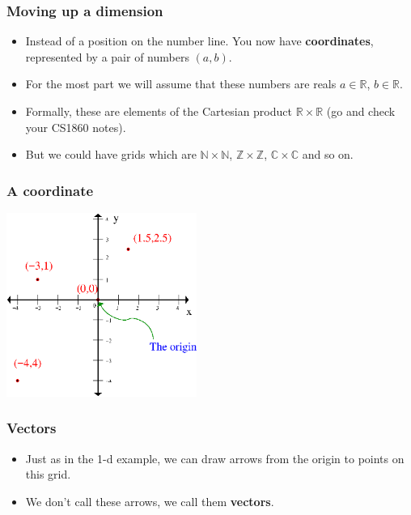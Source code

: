 \documentclass[hyperref={colorlinks=true},xcolor=svgnames]{beamer}
\begin{document}
\begin{frame}
\frametitle{Moving up a dimension}
\begin{itemize}
\item Instead of a position on the number line. You now have {\bf coordinates}, 
represented by a pair of numbers $(a,b)$. 
\pause
\item For the most part we will assume that these numbers are reals $a \in \mathbb{R}$, 
$b \in \mathbb{R}$.
\pause
\item Formally, these are elements of the Cartesian product $\mathbb{R} \times \mathbb{R}$
(go and check your CS1860 notes). 
\pause
\item But we could have grids which are  $\mathbb{N} \times \mathbb{N}$, 
$\mathbb{Z} \times \mathbb{Z}$, $\mathbb{C} \times \mathbb{C}$ 
and so on. 
\end{itemize}
\end{frame}

\begin{frame}
\frametitle{A coordinate}

\vskip1cm
\begin{center}
\includegraphics[height=6cm]{../Figures/2DGrid_plus_coordinate.png}
\end{center}

\end{frame}

\begin{frame}
\frametitle{Vectors}
\begin{itemize}
\item Just as in the 1-d example, we can draw arrows from the origin to points on this grid. 
\pause
\item We don't call these arrows, we call them {\bf vectors}.
\end{itemize}
\end{frame}
\end{document}
